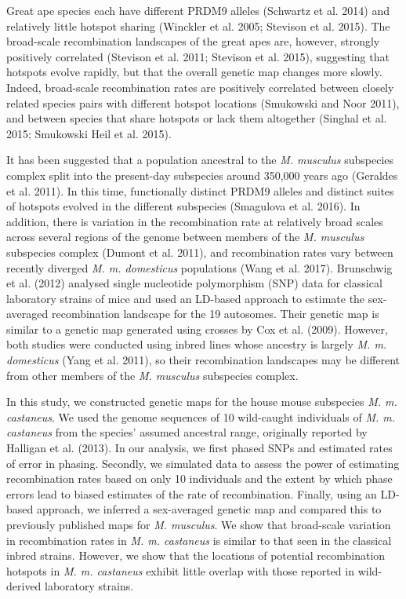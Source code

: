 Great ape species each have different PRDM9 alleles (Schwartz et al. 2014) and relatively little hotspot sharing (Winckler et al. 2005; Stevison et al. 2015). The broad-scale recombination landscapes of the great apes are, however, strongly positively correlated (Stevison et al. 2011; Stevison et al. 2015), suggesting that hotspots evolve rapidly, but that the overall genetic map changes more slowly. Indeed, broad-scale recombination rates are positively correlated between closely related species pairs with different hotspot locations (Smukowski and Noor 2011), and between species that share hotspots or lack them altogether (Singhal et al. 2015; Smukowski Heil et al. 2015).
 
It has been suggested that a population ancestral to the \textit{M. musculus} subspecies complex split into the present-day subspecies around 350,000 years ago (Geraldes et al. 2011). In this time, functionally distinct PRDM9 alleles and distinct suites of hotspots evolved in the different subspecies (Smagulova et al. 2016). In addition, there is variation in the recombination rate at relatively broad scales across several regions of the genome between members of the \textit{M. musculus} subspecies complex (Dumont et al. 2011), and recombination rates vary between recently diverged \textit{M. m. domesticus} populations (Wang et al. 2017). Brunschwig et al. (2012) analysed single nucleotide polymorphism (SNP) data for classical laboratory strains of mice and used an LD-based approach to estimate the sex-averaged recombination landscape for the 19 autosomes. Their genetic map is similar to a genetic map generated using crosses by Cox et al. (2009). However, both studies were conducted using inbred lines whose ancestry is largely \textit{M. m. domesticus} (Yang et al. 2011), so their recombination landscapes may be different from other members of the \textit{M. musculus} subspecies complex.
 
In this study, we constructed genetic maps for the house mouse subspecies \textit{M. m. castaneus}. We used the genome sequences of 10 wild-caught individuals of \textit{M. m. castaneus} from the species’ assumed ancestral range, originally reported by Halligan et al. (2013). In our analysis, we first phased SNPs and estimated rates of error in phasing. Secondly, we simulated data to assess the power of estimating recombination rates based on only 10 individuals and the extent by which phase errors lead to biased estimates of the rate of recombination. Finally, using an LD-based approach, we inferred a sex-averaged genetic map and compared this to previously published maps for \textit{M. musculus}. We show that broad-scale variation in recombination rates in \textit{M. m. castaneus} is similar to that seen in the classical inbred strains. However, we show that the locations of potential recombination hotspots in \textit{M. m. castaneus} exhibit little overlap with those reported in wild-derived laboratory strains.

